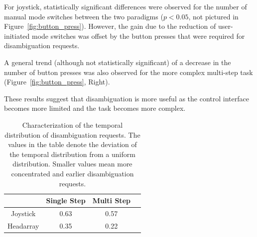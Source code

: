 \documentclass[natbib, twocolumn]{svjour3}          %
\begin{document}
For joystick, statistically significant differences were observed for the number of manual mode switches between the two paradigms ($p < 0.05$, not pictured in Figure~\ref{fig:button_press}). However, the gain due to the reduction of user-initiated mode switches was offset by the button presses that were required for disambiguation requests. 

A general trend (although not statistically significant) of a decrease in the number of button presses was also observed for the more complex multi-step task (Figure~\ref{fig:button_press}, Right). 

These results suggest that disambiguation is more useful as the control interface becomes more limited and the task becomes more complex. 
\begin{table}[t]
	\centering
	\caption{Characterization of the temporal distribution of disambiguation requests. The values in the table denote the deviation of the temporal distribution from a uniform distribution. Smaller values mean more concentrated and earlier disambiguation requests. } 
	\label{table:skewness}
	\begin{tabular}{|c|c|c|c|}
		\hline
		& Single Step & Multi Step \\
		\hline
		Joystick & 0.63 & 0.57 \\
		\hline
		Headarray & 0.35 & 0.22 \\
		\hline
	\end{tabular}
\end{table}
\end{document}
